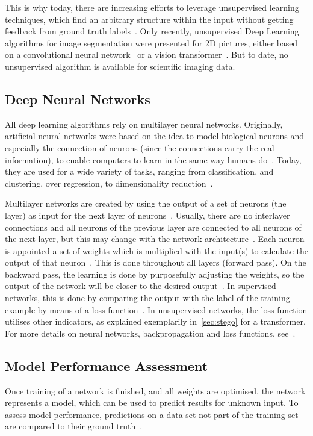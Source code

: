 This is why today, there are increasing efforts to leverage unsupervised learning techniques, which find an arbitrary structure within the input without getting feedback from ground truth labels~\autocite{Burkov2019}.
Only recently, unsupervised Deep Learning algorithms for image segmentation were presented for 2D pictures, either based on a convolutional neural network~\autocite{VanGansbeke2021} or a vision transformer~\autocite{Caron2021}.
But to date, no unsupervised algorithm is available for scientific imaging data.


\subsection{Deep Neural Networks}
All deep learning algorithms rely on multilayer neural networks.
Originally, artificial neural networks were based on the idea to model biological neurons and especially the connection of neurons (since the connections carry the real information), to enable computers to learn in the same way humans do~\autocite{Ertel2017}.
Today, they are used for a wide variety of tasks, ranging from classification, and clustering, over regression, to dimensionality reduction~\autocite{Sarker2021}.

Multilayer networks are created by using the output of a set of neurons (the layer) as input for the next layer of neurons~\autocite[Chapter~4.2]{Skansi2018}.
Usually, there are no interlayer connections and all neurons of the previous layer are connected to all neurons of the next layer, but this may change with the network architecture~\autocite[Chapter~1.2.2]{Aggarwal2018}.
Each neuron is appointed a set of weights which is multiplied with the input(s) to calculate the output of that neuron~\autocite[Chapter~4.2]{Skansi2018}.
This is done throughout all layers (forward pass).
On the backward pass, the learning is done by purposefully adjusting the weights, so the output of the network will be closer to the desired output~\autocite{Ruder2017}.
In supervised networks, this is done by comparing the output with the label of the training example by means of a loss function~\autocite{Aggarwal2018, Ruder2017}.
In unsupervised networks, the loss function utilises other indicators, as explained exemplarily in~\autoref{sec:stego} for a transformer.
For more details on neural networks, backpropagation and loss functions, see~\autocite[e.g.][]{Pouliakis2016, Sharma2020, Ruder2017}.


\subsection{Model Performance Assessment} \label{subsec:model-performance-assessment}
Once training of a network is finished, and all weights are optimised, the network represents a model, which can be used to predict results for unknown input.
To assess model performance, predictions on a data set not part of the training set are compared to their ground truth~\autocite{Aggarwal2018}.

